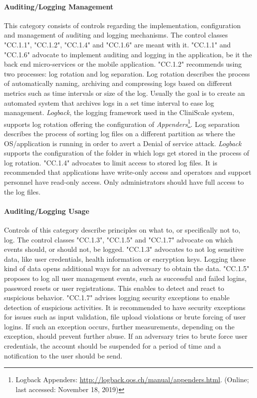 \paragraph{Auditing/Logging Management} This category consists of controls regarding the implementation, configuration and management of auditing and logging mechanisms. The control classes "CC.1.1", "CC.1.2", "CC.1.4" and "CC.1.6" are meant with it. "CC.1.1" and "CC.1.6" advocate to implement auditing and logging in the application, be it the back end micro-services or the mobile application. "CC.1.2" recommends using two processes: log rotation and log separation. Log rotation describes the process of automatically naming, archiving and compressing logs based on different metrics such as time intervals or size of the log. Usually the goal is to create an automated system that archives logs in a set time interval to ease log management. \textit{Logback}, the logging framework used in the CliniScale system, supports log rotation offering the configuration of \textit{Appenders}\footnote{Logback Appenders: \url{http://logback.qos.ch/manual/appenders.html}. (Online; last accessed:  November 18, 2019)}. Log separation describes the process of sorting log files on a different partition as where the OS/application is running in order to avert a Denial of service attack. \textit{Logback} supports the configuration of the folder in which logs get stored in the process of log rotation. "CC.1.4" advocates to limit access to stored log files. It is recommended that applications have write-only access and operators and support personnel have read-only access. Only administrators should have full access to the log files.\\

\paragraph{Auditing/Logging Usage} Controls of this category describe principles on what to, or specifically not to, log. The control classes "CC.1.3", "CC.1.5" and "CC.1.7" advocate on which events should, or should not, be logged.  "CC.1.3" advocates to not log sensitive data, like user credentials, health information or encryption keys. Logging these kind of data opens additional ways for an adversary to obtain the data. "CC.1.5" proposes to log all user management events, such as successful and failed logins, password resets or user registrations. This enables to detect and react to suspicious behavior. "CC.1.7" advises logging security exceptions to enable detection of suspicious activities. It is recommended to have security exceptions for issues such as input validation, file upload violations or brute forcing of user logins. If such an exception occurs, further measurements, depending on the exception, should prevent further abuse. If an adversary tries to brute force user credentials, the account should be suspended for a period of time and a notification to the user should be send.

